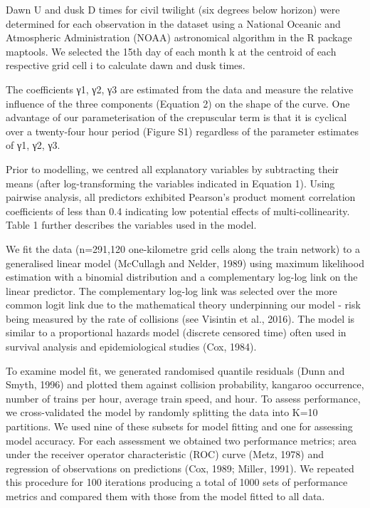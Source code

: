 Dawn U and dusk D times for civil twilight (six degrees below horizon) were determined for each observation in the dataset using a National Oceanic and Atmospheric Administration (NOAA) astronomical algorithm in the R package maptools. We selected the 15th day of each month k at the centroid of each respective grid cell i to calculate dawn and dusk times.

The coefficients γ1, γ2, γ3 are estimated from the data and measure the relative influence of the three components (Equation 2) on the shape of the curve. One advantage of our parameterisation of the crepuscular term is that it is cyclical over a twenty-four hour period (Figure S1) regardless of the parameter estimates of γ1, γ2, γ3.

Prior to modelling, we centred all explanatory variables by subtracting their means (after log-transforming the variables indicated in Equation 1). Using pairwise analysis, all predictors exhibited Pearson's product moment correlation coefficients of less than 0.4 indicating low potential effects of multi-collinearity.  Table 1 further describes the variables used in the model.

We fit the data (n=291,120 one-kilometre grid cells along the train network) to a generalised linear model (McCullagh and Nelder, 1989) using maximum likelihood estimation with a binomial distribution and a complementary log-log link on the linear predictor.  The complementary log-log link was selected over the more common logit link due to the mathematical theory underpinning our model - risk being measured by the rate of collisions (see Visintin et al., 2016).  The model is similar to a proportional hazards model (discrete censored time) often used in survival analysis and epidemiological studies (Cox, 1984).

To examine model fit, we generated randomised quantile residuals (Dunn and Smyth, 1996) and plotted them against collision probability, kangaroo occurrence, number of trains per hour, average train speed, and hour. To assess performance, we cross-validated the model by randomly splitting the data into K=10 partitions. We used nine of these subsets for model fitting and one for assessing model accuracy.  For each assessment we obtained two performance metrics; area under the receiver operator characteristic (ROC) curve (Metz, 1978) and regression of observations on predictions (Cox, 1989; Miller, 1991). We repeated this procedure for 100 iterations producing a total of 1000 sets of performance metrics and compared them with those from the model fitted to all data.

